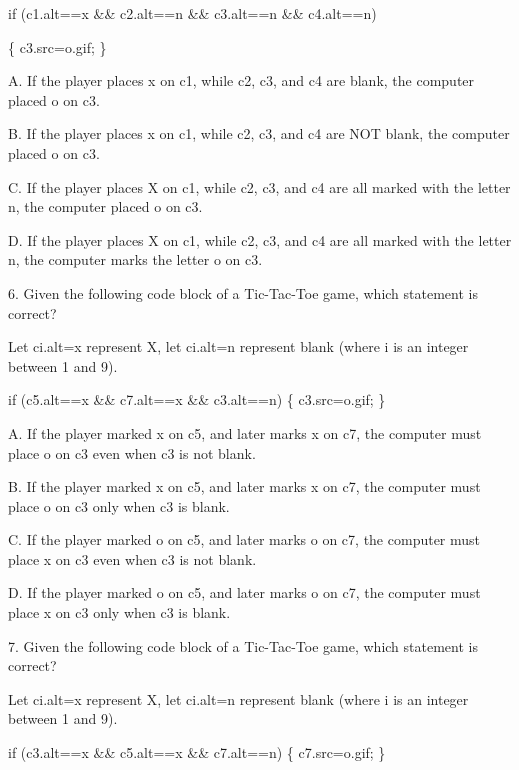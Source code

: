 \documentclass[
]{article}
\begin{document}
if (c1.alt==\textquotesingle x\textquotesingle{} \&\&
c2.alt==\textquotesingle n\textquotesingle{} \&\&
c3.alt==\textquotesingle n\textquotesingle{} \&\&
c4.alt==\textquotesingle n\textquotesingle)

\{ c3.src=\textquotesingle o.gif\textquotesingle; \}

A. If the player places x on c1, while c2, c3, and c4 are blank, the
computer placed o on c3.

B. If the player places x on c1, while c2, c3, and c4 are NOT blank, the
computer placed o on c3.

C. If the player places X on c1, while c2, c3, and c4 are all marked
with the letter \textquotesingle n\textquotesingle, the computer placed
o on c3.

D. If the player places X on c1, while c2, c3, and c4 are all marked
with the letter \textquotesingle n\textquotesingle, the computer marks
the letter \textquotesingle o\textquotesingle{} on c3.

6. Given the following code block of a Tic-Tac-Toe game, which statement
is correct?

Let ci.alt=x represent X, let
ci.alt=\textquotesingle n\textquotesingle{} represent blank (where i is
an integer between 1 and 9).

if (c5.alt==\textquotesingle x\textquotesingle{} \&\&
c7.alt==\textquotesingle x\textquotesingle{} \&\&
c3.alt==\textquotesingle n\textquotesingle) \{
c3.src=\textquotesingle o.gif\textquotesingle; \}

A. If the player marked x on c5, and later marks x on c7, the computer
must place o on c3 even when c3 is not blank.

B. If the player marked x on c5, and later marks x on c7, the computer
must place o on c3 only when c3 is blank.

C. If the player marked o on c5, and later marks o on c7, the computer
must place x on c3 even when c3 is not blank.

D. If the player marked o on c5, and later marks o on c7, the computer
must place x on c3 only when c3 is blank.

7. Given the following code block of a Tic-Tac-Toe game, which statement
is correct?

Let ci.alt=x represent X, let
ci.alt=\textquotesingle n\textquotesingle{} represent blank (where i is
an integer between 1 and 9).

if (c3.alt==\textquotesingle x\textquotesingle{} \&\&
c5.alt==\textquotesingle x\textquotesingle{} \&\&
c7.alt==\textquotesingle n\textquotesingle) \{
c7.src=\textquotesingle o.gif\textquotesingle; \}
\end{document}
